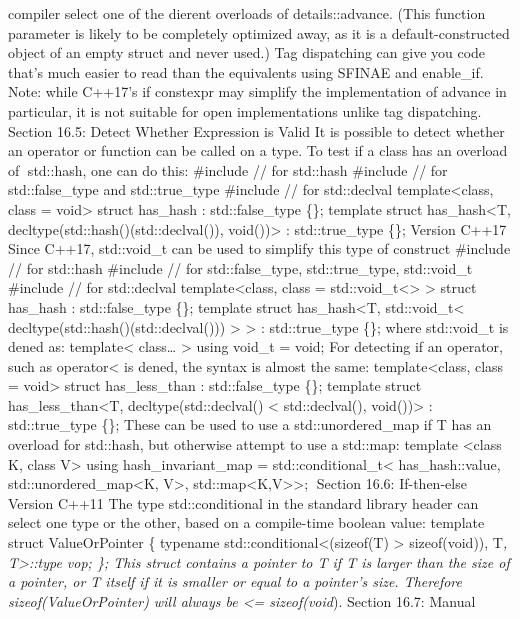 {compiler select one of the dierent overloads of details::advance. (This
function parameter is likely to be completely optimized away, as it is a
default-constructed object of an empty struct and never used.) Tag
dispatching can give you code that's much easier to read than the
equivalents using SFINAE and enable\_if. Note: while C++17's if
constexpr may simplify the implementation of advance in particular, it
is not suitable for open implementations unlike tag dispatching. Section
16.5: Detect Whether Expression is Valid It is possible to detect
whether an operator or function can be called on a type. To test if a
class has an overload of std::hash, one can do this: \#include // for
std::hash \#include // for std::false\_type and std::true\_type
\#include // for std::declval template\textless class, class =
void\textgreater{} struct has\_hash : std::false\_type \{\}; template
struct has\_hash\textless T, decltype(std::hash()(std::declval()),
void())\textgreater{} : std::true\_type \{\}; Version C++17 Since C++17,
std::void\_t can be used to simplify this type of construct \#include //
for std::hash \#include // for std::false\_type, std::true\_type,
std::void\_t \#include // for std::declval template\textless class,
class = std::void\_t\textless\textgreater{} \textgreater{} struct
has\_hash : std::false\_type \{\}; template struct has\_hash\textless T,
std::void\_t\textless{} decltype(std::hash()(std::declval()))
\textgreater{} \textgreater{} : std::true\_type \{\}; where std::void\_t
is dened as: template\textless{} class\ldots{} \textgreater{} using
void\_t = void; For detecting if an operator, such as
operator\textless{} is dened, the syntax is almost the same:
template\textless class, class = void\textgreater{} struct
has\_less\_than : std::false\_type \{\}; template struct
has\_less\_than\textless T, decltype(std::declval() \textless{}
std::declval(), void())\textgreater{} : std::true\_type \{\}; These can
be used to use a std::unordered\_map if T has an overload for std::hash,
but otherwise attempt to use a std::map: template \textless class K,
class V\textgreater{} using hash\_invariant\_map =
std::conditional\_t\textless{} has\_hash::value,
std::unordered\_map\textless K, V\textgreater,
std::map\textless K,V\textgreater\textgreater; Section 16.6:
If-then-else Version C++11 The type std::conditional in the standard
library header can select one type or the other, based on a compile-time
boolean value: template struct ValueOrPointer \{ typename
std::conditional\textless(sizeof(T) \textgreater{} sizeof(void})),
T\emph{, T\textgreater::type vop; \}; This struct contains a pointer to
T if T is larger than the size of a pointer, or T itself if it is
smaller or equal to a pointer's size. Therefore sizeof(ValueOrPointer)
will always be \textless= sizeof(void}). Section 16.7: Manual
